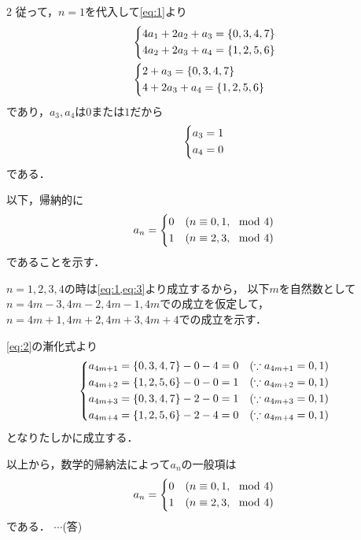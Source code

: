 \documentclass[../../main.tex]{subfiles}
\begin{document}
\begin{multicols}{2}
  従って，$n=1$を代入して\cref{eq:1}より
  \begin{align}
    &
    \begin{dcases}
      4a_1 + 2a_2 + a_3 = \{0,3,4,7\} \\
      4a_2 + 2a_3 + a_4 = \{1,2,5,6\}
    \end{dcases} \\
    &
    \begin{dcases}
      2 + a_3 = \{0,3,4,7\} \\
      4 + 2a_3 + a_4 = \{1,2,5,6\}
    \end{dcases}
  \end{align}
  であり，$a_3,a_4$は$0$または$1$だから
  \begin{align}
    \begin{dcases}
      a_3 = 1 \\
      a_4 = 0
    \end{dcases}\label{eq:3}
  \end{align}
  である．

  以下，帰納的に
  \begin{align}
    a_n =
    \begin{dcases}
      0 & (n\equiv 0,1, \mod 4) \\
      1 & (n\equiv 2,3, \mod 4)
    \end{dcases}
  \end{align}
  であることを示す．

  $n=1,2,3,4$の時は\cref{eq:1,eq:3}より成立するから，
  以下$m$を自然数として$n=4m-3,4m-2,4m-1,4m$での成立を仮定して，
  $n=4m+1,4m+2,4m+3,4m+4$での成立を示す．

  \cref{eq:2}の漸化式より
  \begin{align}
    \begin{dcases}
      a_{4m+1} = \{0, 3, 4, 7\} - 0 - 4 = 0 & (\because a_{4m+1} = 0, 1) \\
      a_{4m+2} = \{1, 2, 5, 6\} - 0 - 0 = 1 & (\because a_{4m+2} = 0, 1) \\
      a_{4m+3} = \{0, 3, 4, 7\} - 2 - 0 = 1 & (\because a_{4m+3} = 0, 1) \\
      a_{4m+4} = \{1, 2, 5, 6\} - 2 - 4 = 0 & (\because a_{4m+4} = 0, 1)
    \end{dcases}
  \end{align}
  となりたしかに成立する．

  以上から，数学的帰納法によって$a_n$の一般項は
  \begin{align}
    a_n =
    \begin{dcases}
      0 & (n\equiv 0, 1, \mod 4) \\
      1 & (n\equiv 2, 3, \mod 4)
    \end{dcases}
  \end{align}
  である．  $\cdots$(答)


\end{multicols}
\end{document}
